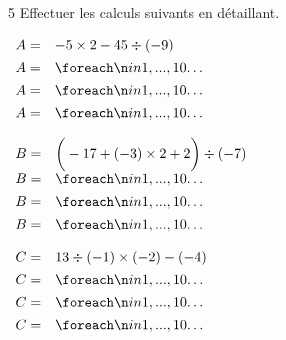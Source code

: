 \documentclass[a4paper]{book}
\begin{document}
{\newpage


     \begin{exerciceNote}{5}
        Effectuer les calculs suivants en détaillant.

        \medskip

        \begin{minipage}{0.30\linewidth}
            $\begin{array}{ll}
                A = & -5\times2-45\div(-9) \\[1ex]
                A = & \points[10]\\[1ex]
                A = & \points[10]\\[1ex]
                A = & \points[10]
            \end{array}$

            \vspace{1cm}

            $\begin{array}{ll}
                B = & \bigg(-17+(-3)\times2+2\bigg)\div(-7) \\[1ex]
                B = & \points[10]\\[1ex]
                B = & \points[10]\\[1ex]
                B = & \points[10]
            \end{array}$
        \end{minipage}
        \hfill
        \begin{minipage}{0.30\linewidth}
            $\begin{array}{ll}
                C = & 13\div(-1)\times(-2)-(-4) \\[1ex]
                C = & \points[10] \\[1ex]
                C = & \points[10] \\[1ex]
                C = & \points[10]
            \end{array}$

            \vspace{1cm}


\end{minipage}
\end{exerciceNote}}
\end{document}
